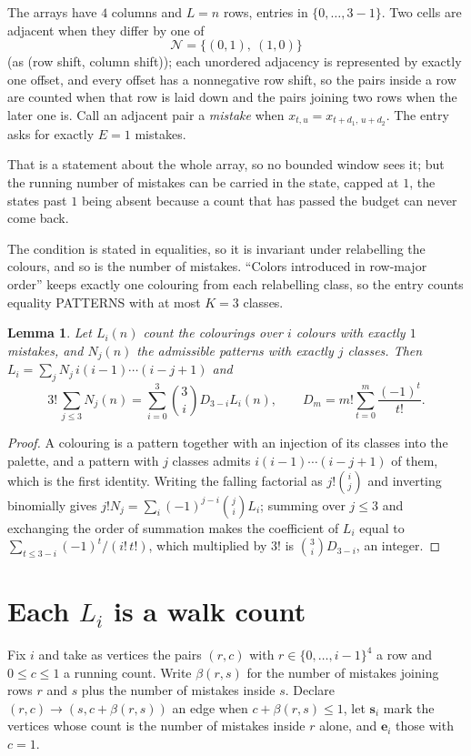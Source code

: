 \documentclass[11pt,a4paper]{article}
\theoremstyle{plain}
\newtheorem{lemma}[theorem]{Lemma}
\theoremstyle{definition}
\begin{document}
The arrays have $4$ columns and $L=n$ rows, entries in $\{0,\dots,3-1\}$.
Two cells are adjacent when they differ by one of
\[
\mathcal N=\{(0,1),\ (1,0)\}
\]
(as (row shift, column shift)); each unordered adjacency is represented by exactly one
offset, and every offset has a nonnegative row shift, so the pairs inside a row are
counted when that row is laid down and the pairs joining two rows when the later one
is. Call an adjacent pair a \emph{mistake} when $x_{t,u}=x_{t+d_1,\,u+d_2}$. The entry asks for exactly
$E=1$ mistakes.

That is a statement about the whole array, so no bounded window sees it; but the running
number of mistakes can be carried in the state, capped at $1$, the states past $1$ being
absent because a count that has passed the budget can never come back.

The condition is stated in equalities, so it is invariant under relabelling the colours, and
so is the number of mistakes. ``Colors introduced in row-major order'' keeps exactly one
colouring from each relabelling class, so the entry counts equality PATTERNS with at most
$K=3$ classes.

\begin{lemma}\label{lem:inv}
Let $L_i(n)$ count the colourings over $i$ colours with exactly $1$ mistakes, and $N_j(n)$
the admissible patterns with exactly $j$ classes. Then
$L_i=\sum_j N_j\,i(i-1)\cdots(i-j+1)$ and
\[
3!\,\sum_{j\le3}N_j(n)=\sum_{i=0}^{3}\binom{3}{i}D_{3-i}L_i(n),
\qquad D_m=m!\sum_{t=0}^{m}\frac{(-1)^t}{t!} .
\]
\end{lemma}

\begin{proof}
A colouring is a pattern together with an injection of its classes into the palette, and a
pattern with $j$ classes admits $i(i-1)\cdots(i-j+1)$ of them, which is the first identity.
Writing the falling factorial as $j!\binom{i}{j}$ and inverting binomially gives
$j!N_j=\sum_i(-1)^{j-i}\binom{j}{i}L_i$; summing over $j\le3$ and exchanging the order
of summation makes the coefficient of $L_i$ equal to $\sum_{t\le3-i}(-1)^t/(i!\,t!)$,
which multiplied by $3!$ is $\binom{3}{i}D_{3-i}$, an integer.
\end{proof}

\section{Each $L_i$ is a walk count}

Fix $i$ and take as vertices the pairs $(r,c)$ with $r\in\{0,\dots,i-1\}^{4}$ a row
and $0\le c\le1$ a running count. Write $\beta(r,s)$ for the number of mistakes joining
rows $r$ and $s$ plus the number of mistakes inside $s$. Declare $(r,c)\to(s,c+\beta(r,s))$
an edge when $c+\beta(r,s)\le1$, let $\mathbf{s}_i$ mark the vertices whose count is the
number of mistakes inside $r$ alone, and $\mathbf{e}_i$ those with $c=1$.
\end{document}
